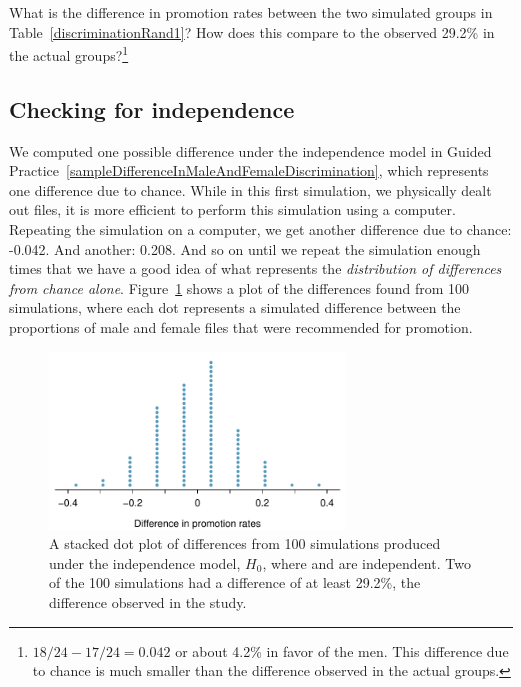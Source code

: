 \begin{exercise} \label{sampleDifferenceInMaleAndFemaleDiscrimination}
What is the difference in promotion rates between the two simulated groups in Table~\ref{discriminationRand1}? How does this compare to the observed 29.2\% in the actual groups?\footnote{$18/24 - 17/24=0.042$ or about 4.2\% in favor of the men. This difference due to chance is much smaller than the difference observed in the actual groups.}
\end{exercise}


\textA{\newpage}

\subsection{Checking for independence}

We computed one possible difference under the independence model in Guided Practice~\ref{sampleDifferenceInMaleAndFemaleDiscrimination}, which represents one difference due to chance. While in this first simulation, we physically dealt out files, it is more efficient to perform this simulation using a computer. Repeating the simulation on a computer, we get another difference due to chance: -0.042. And another: 0.208. And so on until we repeat the simulation enough times that we have a good idea of what represents the \emph{distribution of differences from chance alone}. Figure~\ref{discRandDotPlot} shows a plot of the differences found from 100 simulations, where each dot represents a simulated difference between the proportions of male and female files that were recommended for promotion.

\begin{figure}[ht]
\centering
\includegraphics[width=0.7\textwidth]{ch_summarizing_data/figures/discRandDotPlot/discRandDotPlot}
\caption{A stacked dot plot of differences from 100 simulations produced under the independence model, $H_0$, where  and  are independent. Two of the 100 simulations had a difference of at least 29.2\%, the difference observed in the study.}
\label{discRandDotPlot}
\end{figure}

